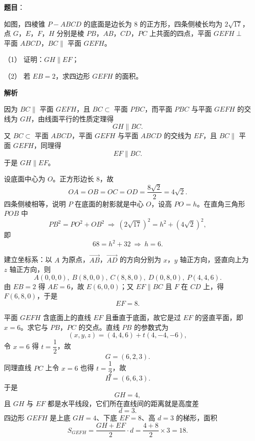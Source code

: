 \begin{answer}

\textbf{题目}：

如图，四棱锥 $P-ABCD$ 的底面是边长为 $8$ 的正方形，四条侧棱长均为 $2\sqrt{17}$，点 $G$，$E$，$F$，$H$ 分别是棱 $PB$，$AB$，$CD$，$PC$ 上共面的四点，平面 $GEFH\perp$ 平面 $ABCD$，$BC\parallel$ 平面 $GEFH$。
\nopagebreak[4]
\begin{center}\end{center}
\nopagebreak[4]
（1） 证明：$GH\parallel EF$；

（2） 若 $EB=2$，求四边形 $GEFH$ 的面积。

\textbf{解析}


因为 $BC\parallel$ 平面 $GEFH$，且 $BC\subset$ 平面 $PBC$，而平面 $PBC$ 与平面 $GEFH$ 的交线为 $GH$，由线面平行的性质定理得
\nopagebreak[4]
\[GH\parallel BC .\]
又 $BC\subset$ 平面 $ABCD$，平面 $GEFH$ 与平面 $ABCD$ 的交线为 $EF$，且 $BC\parallel$ 平面 $GEFH$，同理得
\nopagebreak[4]
\[EF\parallel BC .\]
于是 $GH\parallel EF$。


设底面中心为 $O$。正方形边长 $8$，故
\nopagebreak[4]
\[OA=OB=OC=OD=\frac{8\sqrt2}2=4\sqrt2 .\]
四条侧棱相等，说明 $P$ 在底面的射影就是中心 $O$，设高 $PO=h$。在直角三角形 $POB$ 中
\nopagebreak[4]
\[PB^2=PO^2+OB^2\ \Longrightarrow\ (2\sqrt{17})^2=h^2+(4\sqrt2)^2,\]
即
\nopagebreak[4]
\[68=h^2+32\ \Longrightarrow\ h=6 .\]

建立坐标系：以 $A$ 为原点，$\overrightarrow{AB}$，$\overrightarrow{AD}$ 的方向分别为 $x$，$y$ 轴正方向，竖直向上为 $z$ 轴正方向，则
\nopagebreak[4]
\[A(0,0,0),\ B(8,0,0),\ C(8,8,0),\ D(0,8,0),\ P(4,4,6).\]
由 $EB=2$ 得 $AE=6$，故 $E(6,0,0)$；又 $EF\parallel BC$ 且 $F$ 在 $CD$ 上，得 $F(6,8,0)$，于是
\nopagebreak[4]
\[EF=8 .\]

平面 $GEFH$ 含底面上的直线 $EF$ 且垂直于底面，故它是过 $EF$ 的竖直平面，即 $x=6$。求它与 $PB$，$PC$ 的交点。直线 $PB$ 的参数式为
\nopagebreak[4]
\[(x,y,z)=(4,4,6)+t(4,-4,-6),\]
令 $x=6$ 得 $t=\dfrac12$，故
\nopagebreak[4]
\[G=(6,2,3).\]
同理直线 $PC$ 上令 $x=6$ 也得 $t=\dfrac12$，故
\nopagebreak[4]
\[H=(6,6,3).\]
于是
\nopagebreak[4]
\[GH=4,\]
且 $GH$ 与 $EF$ 都是水平线段，它们所在直线间的距离就是高度差
\nopagebreak[4]
\[d=3 .\]
四边形 $GEFH$ 是上底 $GH=4$、下底 $EF=8$、高 $d=3$ 的梯形，面积
\nopagebreak[4]
\[S_{GEFH}=\frac{GH+EF}2\cdot d=\frac{4+8}2\times3=18 .\]



\end{answer}
